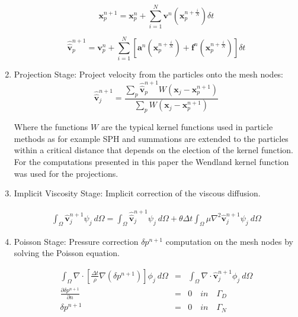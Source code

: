 \begin{enumerate}
\begin{equation}\label{Step2astep}
\mathbf{x}^{n+1}_{p}=\mathbf{x}^{n}_{p} + \sum_{i=1}^{N} \mathbf{v}^{n}(\mathbf{x}^{n+\frac{i}{N}}_{p}) \delta t
\end{equation}

\begin{equation}\label{Step2bstep}
\widehat{\widehat{\mathbf{v}}}^{n+1}_{p}=\mathbf{v}^{n}_{p} + \sum_{i=1}^{N} \left[\mathbf{a}^{n}(\mathbf{x}^{n+\frac{i}{N}}_{p}) + \mathbf{f}^{n} (\mathbf{x}^{n+\frac{i}{N}}_{p})\right]  \delta t
\end{equation}

  \item Projection Stage: Project velocity from the particles onto the mesh nodes:
  \begin{equation}\label{Step3a}
\displaystyle \widehat{\widehat{\mathbf{v}}}^{n+1}_{j}=\frac{\sum_{p} \widehat{\widehat{\mathbf{v}}}^{n+1}_{p} W(\mathbf{x}_{j}-\mathbf{x}_{p}^{n+1})}{\sum_{p} W(\mathbf{x}_{j}-\mathbf{x}_{p}^{n+1})}
\end{equation}



Where the functions $W$ are the typical kernel functions used in particle methods as for example SPH \cite{Mon77} and summations are extended to the particles within a critical distance that depends on the election of the kernel function. For the computations presented in this paper the Wendland kernel function \cite{Wendland} was used for the projections.

  \item Implicit Viscosity Stage: Implicit correction of the viscous diffusion.

 \begin{eqnarray}\label{Step4a}
\displaystyle \int_{\Omega} \widehat{\mathbf{v}}^{n+1}_{j}\psi_j\ d\Omega =\int_{\Omega} \widehat{\widehat{\mathbf{v}}}^{n+1}_{j}\psi_j\  d\Omega + \theta \Delta t \int_{\Omega} \mu \nabla^{2}\widehat{\mathbf{v}}^{n+1}_{j} \psi_j\ d\Omega
\end{eqnarray}



 \item Poisson Stage: Pressure correction $\delta p^{n+1}$ computation on the mesh nodes by solving the Poisson equation.


 \begin{eqnarray}\label{Step5a}
   \int_{\Omega} \nabla \cdot \left[\frac{\Delta t}{\rho}\nabla(\delta p^{n+1})\right] \phi_j\ d\Omega &=& \int_{\Omega} \nabla \cdot \widehat{\mathbf{v}}_j^{n+1} \phi_j\ d\Omega \\
   \frac{\partial \delta p^{n+1}}{\partial n} &=& 0 \quad in \quad \Gamma_D \\
   \delta p^{n+1} &=& 0 \quad in \quad \Gamma_N
 \end{eqnarray}


\end{enumerate}
